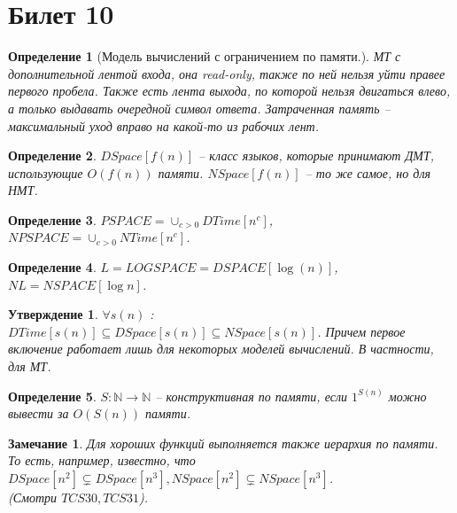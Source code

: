 \documentclass[12pt, letterpaper]{article}
\newtheorem{prop}{Утверждение}[section]
\newtheorem{defi}{Определение}[section]
\newtheorem{note}{Замечание}[section]
\newcommand{\N}{\mathbb{N}}
\begin{document}
\section{Билет 10}	
\begin{defi}[Модель вычислений с ограничением по памяти.]
 МТ с дополнительной лентой входа, она read-only, также по ней нельзя уйти правее первого пробела. Также есть лента выхода, по которой нельзя двигаться влево, а только выдавать очередной символ ответа. Затраченная память -- максимальный уход вправо на какой-то из рабочих лент.
\end{defi}

\begin{defi}
$DSpace[f(n)]$ -- класс языков, которые принимают ДМТ, использующие $O(f(n))$ памяти. $NSpace[f(n)]$ -- то же самое, но для НМТ.
\end{defi}

\begin{defi}
$PSPACE = \cup_{c>0} DTime[n^c]$, $NPSPACE = \cup_{c>0} NTime[n^c]$.
\end{defi}

\begin{defi}
$L = LOGSPACE = DSPACE[\log(n)]$, $NL = NSPACE[\log n]$.
\end{defi}

\begin{prop}
$\forall s(n)$ : $DTime[s(n)] \subseteq DSpace[s(n)] \subseteq NSpace[s(n)]$.
Причем первое включение работает лишь для некоторых моделей вычислений. В частности, для МТ.
\end{prop}

\begin{defi}
$S : \N \rightarrow \N$ -- конструктивная по памяти, если $1^{S(n)}$ можно вывести за $O(S(n))$ памяти.
\end{defi}

\begin{note} Для хороших функций выполняется также иерархия по памяти. То есть, например, известно, что $DSpace[n^2] \subsetneq DSpace[n^3], NSpace[n^2] \subsetneq NSpace[n^3]$.\\
(Смотри $TCS30, TCS31$).
\end{note}
\end{document}
